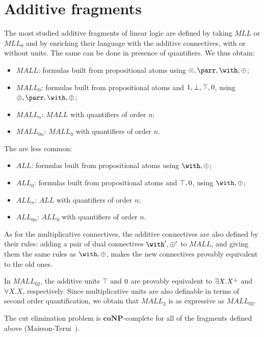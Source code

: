 \section{Additive fragments}\label{additive-fragments}

The most studied additive fragments of linear logic are defined by
taking \(MLL\) or \(MLL_0\) and by enriching their language with the
additive connectives, with or without units. The same can be done in
presence of quantifiers. We thus obtain:
\begin{itemize}
\item
  \(MALL\): formulas built from propositional atoms using
  \(\tens,\parr,\with,\plus\);
\item
  \(MALL_0\): formulas built from propositional atoms and
  \(1,\bot,\top,0\), using \(\tens,\parr,\with,\plus\);
\item
  \(MALL_n\): \(MALL\) with quantifiers of order \(n\);
\item
  \(MALL_{0n}\): \(MALL_0\) with quantifiers of order \(n\).
\end{itemize}

The  are less
common:
\begin{itemize}
\item
  \(ALL\): formulas built from propositional atoms using
  \(\with,\plus\);
\item
  \(ALL_0\): formulas built from propositional atoms and \(\top,0\),
  using \(\with,\plus\);
\item
  \(ALL_n\): \(ALL\) with quantifiers of order \(n\);
\item
  \(ALL_{0n}\): \(ALL_0\) with quantifiers of order \(n\).
\end{itemize}

As for the multiplicative connectives, the additive connectives are also
defined by their rules: adding a pair of dual connectives
\(\with',\plus'\) to \(MALL\), and giving them the same rules as
\(\with,\plus\), makes the new connectives provably equivalent to the
old ones.

In \(MALL_{02}\), the additive units \(\top\) and \(0\) are provably
equivalent to \(\exists X.X^\bot\) and \(\forall X.X\), respectively.
Since multiplicative units are also definable in terms of second order
quantification, we obtain that \(MALL_2\) is as expressive as
\(MALL_{02}\).

The cut elimination problem is \(\mathbf{coNP}\)-complete for all of the
fragments defined above (Mairson-Terui~\cite{cutelimcomplexity}).


